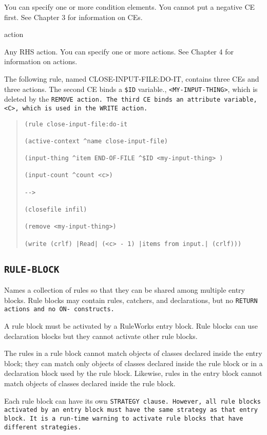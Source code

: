 {{You can specify one or more condition elements. You cannot
put a negative CE first. See Chapter 3 for information on
CEs.

action

Any RHS action. You can specify one or more actions. See
Chapter 4 for information on actions.

\Example

The following rule, named CLOSE-INPUT-FILE:DO-IT, contains
three CEs and three actions. The second CE binds a \verb|$ID|
variable., \verb|<MY-INPUT-THING>|, which is deleted by the \tt{REMOVE}
action. The third CE binds an attribute variable, \verb|<C>|, which
is used in the \tt{WRITE} action.
\begin{quote}
\begin{verbatim}
(rule close-input-file:do-it

(active-context ^name close-input-file)

(input-thing ^item END-OF-FILE ^$ID <my-input-thing> )

(input-count ^count <c>)

-->

(closefile infil)

(remove <my-input-thing>)

(write (crlf) |Read| (<c> - 1) |items from input.| (crlf)))
\end{verbatim}
\end{quote}

\subsection{\tt{RULE-BLOCK}}

Names a collection of rules so that they can be shared among multiple
entry blocks. Rule blocks may contain rules, catchers, and
declarations, but no \tt{RETURN} actions and no \tt{ON-} constructs.

A rule block must be activated by a RuleWorks entry block.  Rule
blocks can use declaration blocks but they cannot activate other rule
blocks.

The rules in a rule block cannot match objects of classes declared
inside the entry block; they can match only objects of classes
declared inside the rule block or in a declaration block used by the
rule block. Likewise, rules in the entry block cannot match objects of
classes declared inside the rule block.

Each rule block can have its own \tt{STRATEGY} clause. However, all rule
blocks activated by an entry block must have the same strategy as that
entry block. It is a run-time warning to activate rule blocks that
have different strategies.

}}
